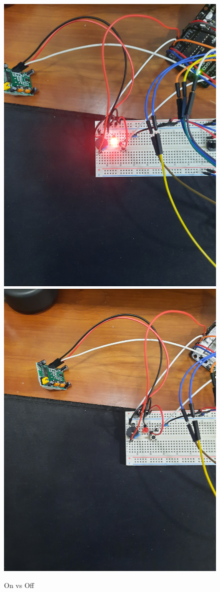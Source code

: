 \begin{figure}[H]
    \centering
    \includegraphics[scale=0.05,angle=-90]{images/testes/sisD_on.jpg}
    \includegraphics[scale=0.05,angle=-90]{images/testes/sisD_off.jpg}
    \caption{On vs Off}
\end{figure}